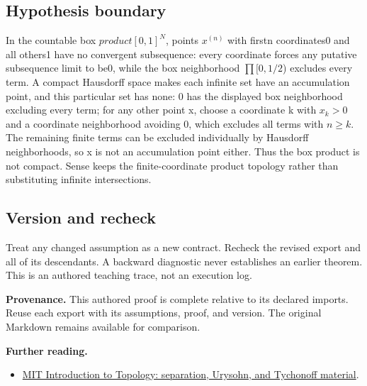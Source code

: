 \documentclass[preprint,12pt,aps,pra,showkeys,amsmath,amssymb,superscriptaddress,floatfix]{revtex4-2}
\theoremstyle{definition}
\theoremstyle{remark}
\providecommand{\tightlist}{\setlength{\itemsep}{2pt}\setlength{\parskip}{0pt}}
\begin{document}
\subsection{Hypothesis boundary}
In the countable box \(product[0,1]^N\), points \(x^{(n)}\) with firstn
coordinates0 and all others1 have no convergent subsequence: every
coordinate forces any putative subsequence limit to be0, while the box
neighborhood \(\prod [0,1/2\)) excludes every term. A compact Hausdorff
space makes each infinite set have an accumulation point, and this
particular set has none: 0 has the displayed box neighborhood excluding
every term; for any other point x, choose a coordinate k with \(x_k>0\)
and a coordinate neighborhood avoiding 0, which excludes all terms with
\(n\ge k\). The remaining finite terms can be excluded individually by
Hausdorff neighborhoods, so x is not an accumulation point either. Thus
the box product is not compact. Sense keeps the finite-coordinate
product topology rather than substituting infinite intersections.

\subsection{Version and recheck}
Treat any changed assumption as a new contract. Recheck the revised
export and all of its descendants. A backward diagnostic never
establishes an earlier theorem. This is an authored teaching trace, not
an execution log.

\par\medskip\begingroup\small\linespread{1.0}\selectfont\noindent\textbf{Provenance.} This authored proof is complete relative to its declared imports. Reuse
each export with its assumptions, proof, and version. The original
Markdown remains available for comparison.
\par\endgroup

\par\smallskip\begingroup\small\linespread{1.0}\selectfont\noindent\textbf{Further reading.} \begin{itemize}
\tightlist
\item
  \href{https://ocw.mit.edu/courses/18-901-introduction-to-topology-fall-2004/pages/lecture-notes/}{MIT
  Introduction to Topology: separation, Urysohn, and Tychonoff
  material}.
\end{itemize}\par\endgroup
\end{document}
